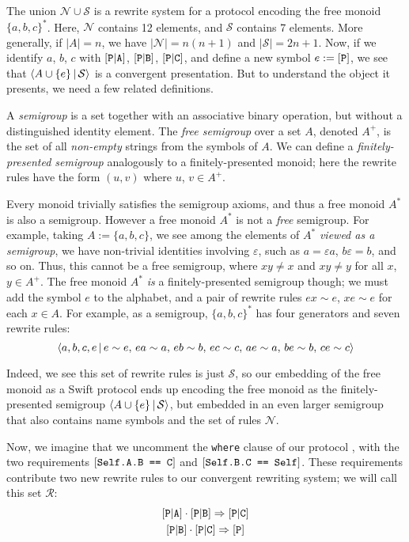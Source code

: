 \documentclass[../generics]{subfiles}
\begin{document}
\begin{example}
The union $\mathcal{N}\cup\mathcal{S}$ is a rewrite system for a protocol encoding the free monoid $\{a,b,c\}^*$. Here, $\mathcal{N}$ contains 12 elements, and $\mathcal{S}$ contains 7 elements. More generally, if $|A|=n$, we have $|\mathcal{N}|=n(n+1)$ and $|\mathcal{S}|=2n+1$. Now, if we identify $a$, $b$, $c$ with $[\texttt{P}|\texttt{A}]$, $[\texttt{P}|\texttt{B}]$, $[\texttt{P}|\texttt{C}]$, and define a new symbol $e:=[\texttt{P}]$, we see that $\langle A\cup\{e\}\,|\,\mathcal{S}\rangle$ is a convergent presentation. But to understand the object it presents, we need a few related definitions.

A \emph{semigroup} is a set together with an associative binary operation, but without a distinguished identity element. The \emph{free semigroup} over a set $A$, denoted $A^+$, is the set of all \emph{non-empty} strings from the symbols of $A$. We can define a \emph{finitely-presented semigroup} analogously to a finitely-presented monoid; here the rewrite rules have the form $(u,v)$ where $u$, $v\in A^+$.

Every monoid trivially satisfies the semigroup axioms, and thus a free monoid $A^*$ is also a semigroup. However a free monoid $A^*$ is not a \emph{free} semigroup. For example, taking $A:=\{a,b,c\}$, we see among the elements of $A^*$ \emph{viewed as a semigroup}, we have non-trivial identities involving $\varepsilon$, such as $a=\varepsilon a$, $b\varepsilon=b$, and so on. Thus, this cannot be a free semigroup, where $xy\neq x$ and $xy\neq y$ for all $x$, $y\in A^+$. The free monoid $A^*$ \emph{is} a finitely-presented semigroup though; we must add the symbol $e$ to the alphabet, and a pair of rewrite rules $ex\sim e$, $xe\sim e$ for each $x\in A$. For example, as a semigroup, $\{a,b,c\}^*$ has four generators and seven rewrite rules:
\[\langle a,b,c,e\,|\,e\sim e,\,ea\sim a,\,eb\sim b,\,ec\sim c,\,ae\sim a,\,be\sim b,\,ce\sim c\rangle\]

Indeed, we see this set of rewrite rules is just $\mathcal{S}$, so our embedding of the free monoid as a Swift protocol ends up encoding the free monoid as the finitely-presented semigroup $\langle A\cup\{e\}\,|\,\mathcal{S}\rangle$, but embedded in an even larger semigroup that also contains name symbols and the set of rules $\mathcal{N}$.

Now, we imagine that we uncomment the \texttt{where} clause of our protocol \tP, with the two requirements $[\texttt{Self.A.B == C}]$ and $[\texttt{Self.B.C == Self}]$. These requirements contribute two new rewrite rules to our convergent rewriting system; we will call this set $\mathcal{R}$:
\begin{gather*}
\aPA\cdot\aPB\Rightarrow\aPC\\
\aPB\cdot\aPC\Rightarrow\pP
\end{gather*}


\end{example}
\end{document}
